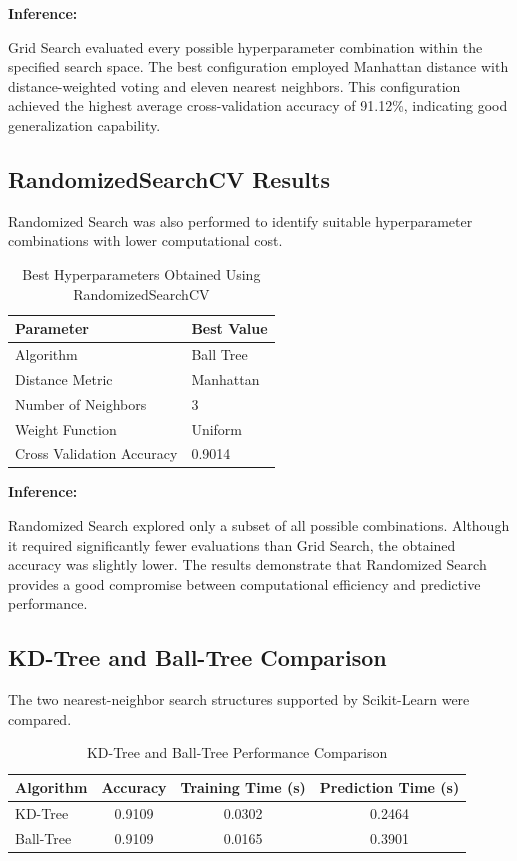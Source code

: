 \documentclass[12pt,a4paper]{article}
\begin{document}
	\textbf{Inference:}
	
	Grid Search evaluated every possible hyperparameter combination within the specified search space. The best configuration employed Manhattan distance with distance-weighted voting and eleven nearest neighbors. This configuration achieved the highest average cross-validation accuracy of 91.12\%, indicating good generalization capability.
	
	\subsection{RandomizedSearchCV Results}
	
	Randomized Search was also performed to identify suitable hyperparameter combinations with lower computational cost.
	
	\begin{table}[H]
		\centering
		\caption{Best Hyperparameters Obtained Using RandomizedSearchCV}
		\begin{tabular}{ll}
			\toprule
			Parameter & Best Value\\
			\midrule
			Algorithm & Ball Tree\\
			Distance Metric & Manhattan\\
			Number of Neighbors & 3\\
			Weight Function & Uniform\\
			Cross Validation Accuracy & 0.9014\\
			\bottomrule
		\end{tabular}
	\end{table}
	
	\textbf{Inference:}
	
	Randomized Search explored only a subset of all possible combinations. Although it required significantly fewer evaluations than Grid Search, the obtained accuracy was slightly lower. The results demonstrate that Randomized Search provides a good compromise between computational efficiency and predictive performance.
	
	\subsection{KD-Tree and Ball-Tree Comparison}
	
	The two nearest-neighbor search structures supported by Scikit-Learn were compared.
	
	\begin{table}[H]
		\centering
		\caption{KD-Tree and Ball-Tree Performance Comparison}
		\begin{tabular}{lccc}
			\toprule
			Algorithm & Accuracy & Training Time (s) & Prediction Time (s)\\
			\midrule
			KD-Tree & 0.9109 & 0.0302 & 0.2464\\
			Ball-Tree & 0.9109 & 0.0165 & 0.3901\\
			\bottomrule
		\end{tabular}
	\end{table}
	
\end{document}
